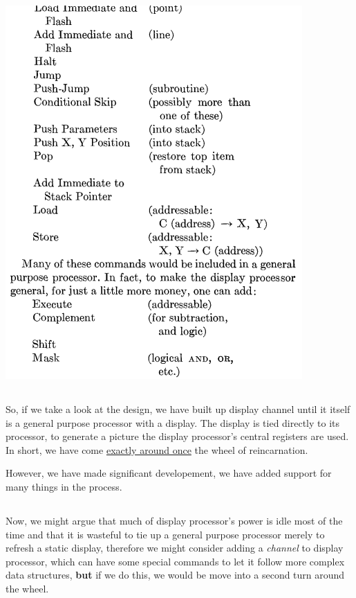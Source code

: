 \documentclass[11pt]{article}
\begin{document}
\begin{center}
\includegraphics[width=.9\linewidth]{./images/rel2.png}
\end{center}

\subsection{}
\label{sec:org71ea435}

So, if we take a look at the design, we have built up display channel
until it itself is a general purpose processor with a display. The
display is tied directly to its processor, to generate a picture the
display processor's central registers are used. In short, we have come
\uline{exactly around once} the wheel of reincarnation.

However, we have made significant developement, we have added support
for many things in the process.

\subsection{}
\label{sec:orgd488c35}

Now, we might argue that much of display processor's power is idle most
of the time and that it is wasteful to tie up a general purpose processor
merely to refresh a static display, therefore we might consider adding
a \emph{channel} to display processor, which can have some special commands
to let it follow more complex data structures, \textbf{but} if we do this, we 
would be move into a second turn around the wheel.
\end{document}
